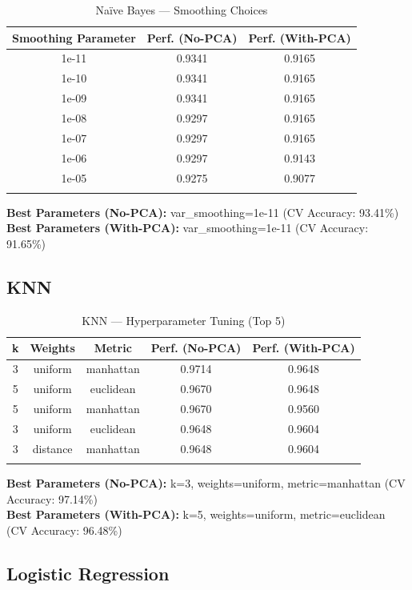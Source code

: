 \documentclass[12pt,a4paper]{article}
\begin{document}
\begin{longtable}{|c|c|c|}
\hline
\textbf{Smoothing Parameter} & \textbf{Perf. (No-PCA)} & \textbf{Perf. (With-PCA)} \\ \hline
\endhead
1e-11 & 0.9341 & 0.9165 \\ \hline
1e-10 & 0.9341 & 0.9165 \\ \hline
1e-09 & 0.9341 & 0.9165 \\ \hline
1e-08 & 0.9297 & 0.9165 \\ \hline
1e-07 & 0.9297 & 0.9165 \\ \hline
1e-06 & 0.9297 & 0.9143 \\ \hline
1e-05 & 0.9275 & 0.9077 \\ \hline
\caption{Na\"ive Bayes — Smoothing Choices}
\label{tab:nb_tuning}
\end{longtable}

\textbf{Best Parameters (No-PCA):} var\_smoothing=1e-11 (CV Accuracy: 93.41\%)\\
\textbf{Best Parameters (With-PCA):} var\_smoothing=1e-11 (CV Accuracy: 91.65\%)

\subsection{KNN}

\begin{longtable}{|c|c|c|c|c|}
\hline
\textbf{k} & \textbf{Weights} & \textbf{Metric} & \textbf{Perf. (No-PCA)} & \textbf{Perf. (With-PCA)} \\ \hline
\endhead
3 & uniform & manhattan & 0.9714 & 0.9648 \\ \hline
5 & uniform & euclidean & 0.9670 & 0.9648 \\ \hline
5 & uniform & manhattan & 0.9670 & 0.9560 \\ \hline
3 & uniform & euclidean & 0.9648 & 0.9604 \\ \hline
3 & distance & manhattan & 0.9648 & 0.9604 \\ \hline
\caption{KNN — Hyperparameter Tuning (Top 5)}
\label{tab:knn_tuning}
\end{longtable}

\textbf{Best Parameters (No-PCA):} k=3, weights=uniform, metric=manhattan (CV Accuracy: 97.14\%)\\
\textbf{Best Parameters (With-PCA):} k=5, weights=uniform, metric=euclidean (CV Accuracy: 96.48\%)

\subsection{Logistic Regression}
\end{document}
